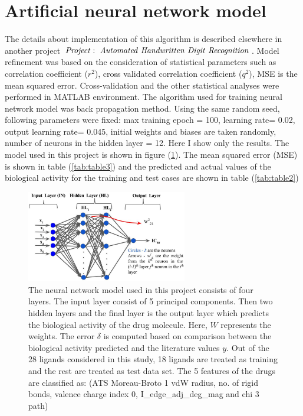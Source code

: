 \documentclass[twocolumn]{article}
\begin{document}
\section{Artificial neural network model}
The details about implementation of this algorithm is described elsewhere in another project ${\it Project:\ Automated\ Handwritten\ Digit\ Recognition}$. 
Model refinement was based on
      the consideration of statistical parameters such as correlation
      coefficient ($r^2$), cross validated correlation coefficient ($q^2$), MSE is the
      mean squared error. Cross-validation and the other statistical analyses
      were performed in MATLAB environment. The algorithm used for training
      neural network model was back propagation method. Using the same random
      seed, following parameters were fixed: max training epoch = 100, learning
      rate= 0.02, output learning rate= 0.045, initial weights and biases are
      taken randomly, number of neurons in the hidden layer = 12.
Here I show only the results. 
The model used in this project is shown in figure (\ref{fig:model}). The mean squared error (MSE) is shown in table (\ref{tab:table3}) and the predicted and actual values of the biological activity for the training and test cases are shown in table (\ref{tab:table2})
\begin{figure}
                \includegraphics[clip=true,trim=0.1cm 0.1cm 0.1cm
                0cm,width=7cm]{ann.eps}
		\caption{The neural network model used in this project consists of four layers. The input layer consist of 5 principal components. Then two hidden layers and the final layer is the output layer which predicts the biological activity of the drug molecule. Here, $W$ represents the weights. The error $\delta$ is computed based on comparison between the biological activity predicted and the literature values $y$.
              Out of the 28 ligands considered in this study, 18 ligands are treated as training and the rest are
          treated as test data set. The 5 features of the drugs are classified as: (ATS Moreau-Broto 1 vdW radius, no. of rigid
      bonds, valence charge index 0, I\_edge\_adj\_deg\_mag and chi 3 path)}
\label{fig:model}
\end{figure}
\end{document}
